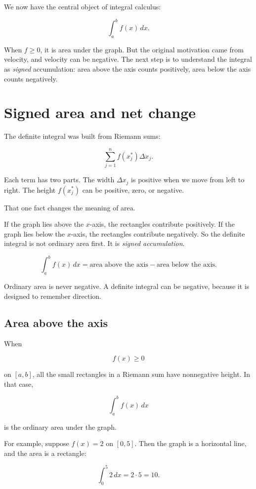 We now have the central object of integral calculus:

\[
\int_a^b f(x)\,dx.
\]

When \(f\ge0\), it is area under the graph.  But the original motivation came from
velocity, and velocity can be negative.  The next step is to understand the integral as
\emph{signed} accumulation: area above the axis counts positively, area below the axis
counts negatively.
\section{Signed area and net change}
\label{sec:signed-area-net-change}

The definite integral was built from Riemann sums:

\[
\sum_{j=1}^{n} f(x_j^*)\Delta x_j.
\]

Each term has two parts.  The width \(\Delta x_j\) is positive when we move from left to
right.  The height \(f(x_j^*)\) can be positive, zero, or negative.

That one fact changes the meaning of area.

If the graph lies above the \(x\)-axis, the rectangles contribute positively.  If the graph
lies below the \(x\)-axis, the rectangles contribute negatively.  So the definite integral is
not ordinary area first.  It is \emph{signed accumulation}.

\[
\boxed{
\int_a^b f(x)\,dx
=
\text{area above the axis}
-
\text{area below the axis}.
}
\]

Ordinary area is never negative.  A definite integral can be negative, because it is designed
to remember direction.

\subsection{Area above the axis}
\label{subsec:area-above-axis}

When

\[
f(x)\ge 0
\]

on \([a,b]\), all the small rectangles in a Riemann sum have nonnegative height.  In that
case,

\[
\int_a^b f(x)\,dx
\]

is the ordinary area under the graph.

For example, suppose \(f(x)=2\) on \([0,5]\).  Then the graph is a horizontal line, and the
area is a rectangle:

\[
\int_0^5 2\,dx=2\cdot5=10.
\]

